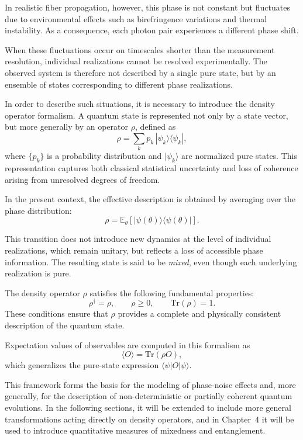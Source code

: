 \documentclass[a4paper]{article}
\begin{document}
In realistic fiber propagation, however, this phase is not constant but fluctuates due to environmental effects such as birefringence variations and thermal instability. As a consequence, each photon pair experiences a different phase shift.

When these fluctuations occur on timescales shorter than the measurement resolution, individual realizations cannot be resolved experimentally. The observed system is therefore not described by a single pure state, but by an ensemble of states corresponding to different phase realizations.

\medskip

In order to describe such situations, it is necessary to introduce the density operator formalism. A quantum state is represented not only by a state vector, but more generally by an operator \(\rho\), defined as
\[
\rho = \sum_k p_k \, |\psi_k\rangle\langle \psi_k|,
\]
where \(\{p_k\}\) is a probability distribution and \(|\psi_k\rangle\) are normalized pure states. This representation captures both classical statistical uncertainty and loss of coherence arising from unresolved degrees of freedom.

\medskip

In the present context, the effective description is obtained by averaging over the phase distribution:
\[
\rho = \mathbb{E}_{\theta}\left[ |\psi(\theta)\rangle\langle \psi(\theta)| \right].
\]

This transition does not introduce new dynamics at the level of individual realizations, which remain unitary, but reflects a loss of accessible phase information. The resulting state is said to be \emph{mixed}, even though each underlying realization is pure.

\medskip

The density operator \(\rho\) satisfies the following fundamental properties:
\[
\rho^\dagger = \rho, 
\qquad
\rho \ge 0, 
\qquad
\mathrm{Tr}(\rho) = 1.
\]
These conditions ensure that \(\rho\) provides a complete and physically consistent description of the quantum state.

\medskip

Expectation values of observables are computed in this formalism as
\[
\langle O \rangle = \mathrm{Tr}(\rho O),
\]
which generalizes the pure-state expression \(\langle \psi | O | \psi \rangle\).

\medskip

This framework forms the basis for the modeling of phase-noise effects and, more generally, for the description of non-deterministic or partially coherent quantum evolutions. In the following sections, it will be extended to include more general transformations acting directly on density operators, and in Chapter~4 it will be used to introduce quantitative measures of mixedness and entanglement.
\end{document}
